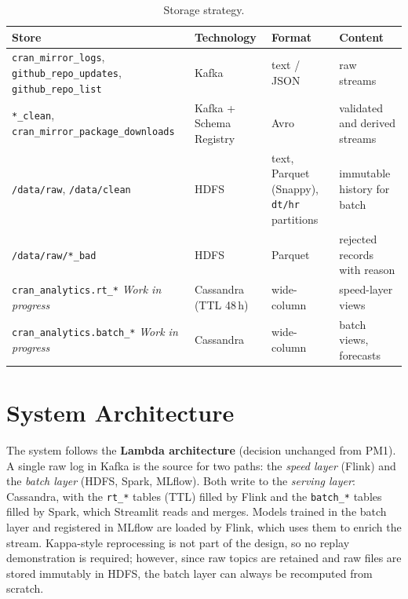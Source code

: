 \documentclass[11pt,a4paper]{article}
\newcommand{\planned}{\textit{Work in progress}}
\begin{document}
\begin{table}[H]
\centering
\caption{Storage strategy.}
\small
\begin{tabularx}{\textwidth}{@{}L{4.6cm}L{2.7cm}L{3.2cm}Y@{}}
\toprule
\textbf{Store} & \textbf{Technology} & \textbf{Format} & \textbf{Content} \\
\midrule
\texttt{cran\_\allowbreak{}mirror\_\allowbreak{}logs}, \texttt{github\_\allowbreak{}repo\_\allowbreak{}updates}, \texttt{github\_\allowbreak{}repo\_\allowbreak{}list} & Kafka & text / JSON & raw streams \\
\texttt{*\_\allowbreak{}clean}, \texttt{cran\_\allowbreak{}mirror\_\allowbreak{}package\_\allowbreak{}downloads} & Kafka + Schema Registry & Avro & validated and derived streams \\
\texttt{/data/raw}, \texttt{/data/clean} & HDFS & text, Parquet (Snappy), \texttt{dt/hr} partitions & immutable history for batch \\
\texttt{/data/raw/*\_\allowbreak{}bad} & HDFS & Parquet & rejected records with reason \\
\texttt{cran\_\allowbreak{}analytics.rt\_\allowbreak{}*} \planned & Cassandra (TTL 48\,h) & wide-column & speed-layer views \\
\texttt{cran\_\allowbreak{}analytics.batch\_\allowbreak{}*} \planned & Cassandra & wide-column & batch views, forecasts \\
\bottomrule
\end{tabularx}
\end{table}

\section{System Architecture}

The system follows the \textbf{Lambda architecture} (decision unchanged from PM1). A single raw log in Kafka is the source
for two paths: the \emph{speed layer} (Flink) and the \emph{batch layer} (HDFS, Spark, MLflow). Both write to the \emph{serving layer}:
Cassandra, with the \texttt{rt\_\allowbreak{}*} tables (TTL) filled by Flink and the \texttt{batch\_\allowbreak{}*} tables filled by Spark, which Streamlit reads and merges.
Models trained in the batch layer and registered in MLflow are loaded by Flink, which uses them to enrich the stream. Kappa-style reprocessing is not part of the design, so no replay demonstration is
required; however, since raw topics are retained and raw files are stored immutably in HDFS, the batch layer can always be recomputed from scratch.
\end{document}
